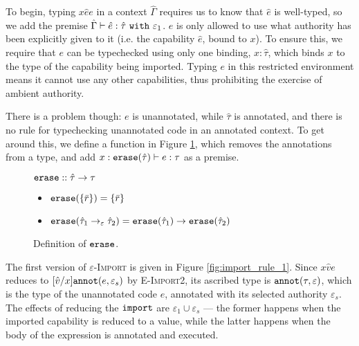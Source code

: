To begin, typing ${x}{\hat e}{e}$ in a context
$\hat \Gamma$ requires us to know that $\hat e$ is
well-typed, so we add the premise
$\hat \Gamma \vdash \hat e: \hat \tau~\mathtt{with}~ \varepsilon_1$.
$e$ is only allowed to use what authority has been explicitly given to it
(i.e. the capability $\hat e$, bound to $x$). To ensure this, we require
that $e$ can be typechecked using only one binding, $x: \hat \tau$,
which binds $x$ to the type of the capability being imported.
Typing $e$ in this restricted environment means it cannot use any
other capabilities, thus prohibiting the exercise of ambient authority.

There is a problem though: $e$ is unannotated, while $\hat \tau$ is
annotated, and there is no rule for typechecking unannotated code in
an annotated context. To get around this, we define a function
 in Figure \ref{fig:erase_defn}, which removes the
annotations from a type, and add
$x: \mathtt{erase}(\hat \tau) \vdash e: \tau$ as a premise.


\begin{figure}
\vspace{-0.2cm}
$\mathtt{erase} :: \hat \tau \rightarrow \tau$
\begin{itemize}
	\setlength\itemsep{-0.2em}
	\item[] $\mathtt{erase}(\{ \bar r \}) = \{ \bar r \}$
	\item[] $\mathtt{erase}(\hat \tau_1 \rightarrow_{\varepsilon} \hat \tau_2) = \mathtt{erase}(\hat \tau_1) \rightarrow \mathtt{erase}(\hat \tau_2)$
\end{itemize}


\vspace{-0.5cm}
\caption{Definition of $\mathtt{erase}$.}
\vspace{-0.5cm}
\label{fig:erase_defn}
\end{figure}

The first version of \textsc{$\varepsilon$-Import} is given in Figure
\ref{fig:import_rule_1}. Since
${x}{\hat v}{e}$ reduces to $[\hat
v/x]\mathtt{annot}(e, \varepsilon_s)$ by \textsc{E-Import2}, its ascribed type is $\mathtt{annot}(\tau, \varepsilon)$, which is the type of the unannotated
code $e$, annotated with its selected authority $\varepsilon_s$. The
effects of reducing the $\mathtt{import}$ are $\varepsilon_1 \cup \varepsilon_s$
--- the former happens when the imported capability is reduced to a value,
while the latter happens when the body of the  expression is
annotated and executed.


